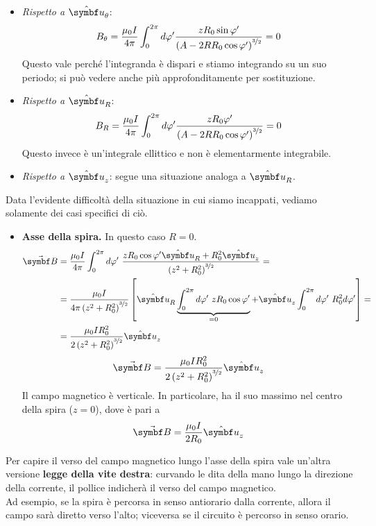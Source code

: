 \begin{itemize}
	\item \textit{Rispetto a }$\vbh{u}_{\theta}$:
	\begin{equation*}
		B_\theta=\frac{\mu_0 I}{4\pi }\int_0^{2\pi}d\phi'\frac{zR_0\sin\phi'}{\left(A-2RR_0\cos\phi'\right)^{\nicefrac{3}{2}}}=0
	\end{equation*}
	Questo vale perché l'integranda è dispari e stiamo integrando su un suo periodo; si può vedere anche più approfonditamente per sostituzione.
	\item \textit{Rispetto a} $\vbh{u}_{R}$:
	\begin{equation*}
		B_R=\frac{\mu_0 I}{4\pi }\int_0^{2\pi}d\phi'\frac{zR_0\phi'}{\left(A-2RR_0\cos\phi'\right)^{\nicefrac{3}{2}}}=0
	\end{equation*}
	Questo invece è un'integrale ellittico e non è elementarmente integrabile.
	\item \textit{Rispetto a} $\vbh{u}_z$: segue una situazione analoga a $\vbh{u}_R$.
\end{itemize}
Data l'evidente difficoltà della situazione in cui siamo incappati, vediamo solamente dei casi specifici di ciò.
\begin{itemize}
	\item \textbf{Asse della spira.} In questo caso $R=0$.
	\begin{align*}
		\vba{B}&=\frac{\mu_0 I}{4\pi }\int_0^{2\pi}d\phi'\ \frac{zR_0\cos\phi'\vbh{u}_R+R_0^2\vbh{u}_z}{\left(z^2+R_0^2\right)^{\nicefrac{3}{2}}}=\\
		&=\frac{\mu_0 I}{4\pi \left(z^2+R_0^2\right)^{\nicefrac{3}{2}}}\left[\vbh{u}_R\underbrace{\int_0^{2\pi}d\phi'\ zR_0\cos\phi'}_{=0} + \vbh{u}_z \int_0^{2\pi}d\phi'\ R_0^2d\phi'\right]=\\
		&=\frac{\mu_0 I R_0^2}{2 \left(z^2+R_0^2\right)^{\nicefrac{3}{2}}}\vbh{u}_z
	\end{align*}
	\begin{equation}
		\vba{B}=\frac{\mu_0 I R_0^2}{2 \left(z^2+R_0^2\right)^{\nicefrac{3}{2}}}\vbh{u}_z
	\end{equation}
	Il campo magnetico è verticale. In particolare, ha il suo massimo nel centro della spira ($z=0$), dove è pari a
	\begin{equation}
		\vba{B}=\frac{\mu_0 I}{2R_0}\vbh{u}_z
	\end{equation}
\end{itemize}
\begin{observe}
	Per capire il verso del campo magnetico lungo l'asse della spira vale un'altra versione \textbf{legge della vite destra}: curvando le dita della mano lungo la direzione della corrente, il pollice indicherà il verso del campo magnetico.\\
	Ad esempio, se la spira è percorsa in senso antiorario dalla corrente, allora il campo sarà diretto verso l'alto; viceversa se il circuito è percorso in senso orario.
\end{observe}
